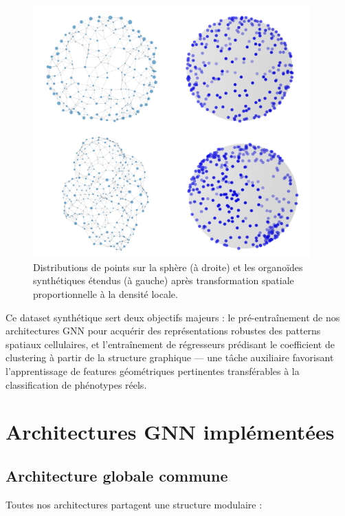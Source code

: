 \begin{figure}[htbp]
    \centering
    \includegraphics[width=0.95\textwidth]{../img/Modelisation.png}
    \caption{Distributions de points sur la sphère (à droite) et les organoïdes synthétiques étendus (à gauche) après transformation spatiale proportionnelle à la densité locale.}
    \label{fig:modelisation}
\end{figure}

Ce dataset synthétique sert deux objectifs majeurs : le pré-entraînement de nos architectures GNN pour acquérir des représentations robustes des patterns spatiaux cellulaires, et l'entraînement de régresseurs prédisant le coefficient de clustering à partir de la structure graphique — une tâche auxiliaire favorisant l'apprentissage de features géométriques pertinentes transférables à la classification de phénotypes réels.

\section{Architectures GNN implémentées}

\subsection{Architecture globale commune}

Toutes nos architectures partagent une structure modulaire :

